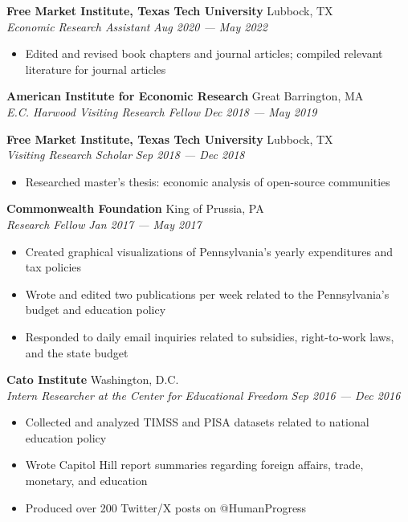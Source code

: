 \documentclass[a4paper,11pt]{article}
\begin{document}
\textbf{Free Market Institute, Texas Tech University} \hfill Lubbock, TX\\
\textit{Economic Research Assistant} \hfill  \emph{Aug 2020 --- May 2022} \\
\begin{itemize}
    \item Edited and revised book chapters and journal articles; compiled relevant literature for journal articles
\end{itemize}
\vspace{1mm}

\textbf{American Institute for Economic Research} \hfill Great Barrington, MA\\
\textit{E.C. Harwood Visiting Research Fellow} \hfill  \emph{Dec 2018 --- May 2019}\\
\vspace{1mm}

\textbf{Free Market Institute, Texas Tech University} \hfill Lubbock, TX\\
\textit{Visiting Research Scholar} \hfill  \emph{Sep 2018 --- Dec 2018}\\
\begin{itemize}
    \item Researched master's thesis: economic analysis of open-source communities
\end{itemize}
\vspace{1mm}

\textbf{Commonwealth Foundation} \hfill King of Prussia, PA\\
\textit{Research Fellow} \hfill  \emph{Jan 2017 --- May 2017}\\
\begin{itemize}
    \item Created graphical visualizations of Pennsylvania's yearly expenditures and tax policies
    \item Wrote and edited two publications per week related to the Pennsylvania's budget and education policy
    \item Responded to daily email inquiries related to subsidies, right-to-work laws, and the state budget
\end{itemize}
\vspace{1mm}

\textbf{Cato Institute} \hfill Washington, D.C.\\
\textit{Intern Researcher at the Center for Educational Freedom} \hfill \emph{Sep 2016 --- Dec 2016}\\
\begin{itemize}
    \item Collected and analyzed TIMSS and PISA datasets related to national education policy
    \item Wrote Capitol Hill report summaries regarding foreign affairs, trade, monetary, and education
    \item Produced over 200 Twitter/X posts on @HumanProgress
\end{itemize}
\vspace{1mm}
\end{document}
